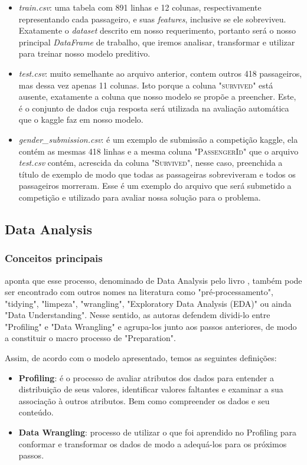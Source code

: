 \begin{itemize}
\item \emph{train.csv}:  uma tabela com 891 linhas e 12 colunas, respectivamente representando cada passageiro, e suas \emph{features}, inclusive se ele sobreviveu. Exatamente o \emph{dataset} descrito em nosso requerimento, portanto será o nosso principal \emph{DataFrame} de trabalho, que iremos analisar, transformar e utilizar para treinar nosso modelo preditivo.  
\item \emph{test.csv}: muito semelhante ao arquivo anterior, contem outros 418 passageiros, mas dessa vez apenas 11 colunas. Isto porque a coluna "\textsc{survived}" está ausente, exatamente a coluna que nosso modelo se propõe a preencher. Este, é o conjunto de dados cuja resposta será utilizada na avaliação automática que o kaggle faz em nosso modelo. 
\item \emph{gender\_submission.csv}: é um exemplo de submissão a competição kaggle, ela contém as mesmas 418 linhas e a mesma coluna "\textsc{PassengerId}" que o arquivo \emph{test.csv} contém, acrescida da coluna "\textsc{Survived}", nesse caso, preenchida a título de exemplo de modo que todas as passageiras sobreviveram e todos os passageiros morreram. Esse é um exemplo do arquivo que será submetido a competição e utilizado para avaliar nossa solução para o problema. 
\end{itemize}

\subsection{Data Analysis}
\subsubsection{Conceitos principais}
\cite{BATON} aponta que esse processo, denominado de Data Analysis pelo livro \cite{DATAPYTHON}, também pode ser encontrado com outros nomes na literatura como "pré-processamento", "tidying", "limpeza", "wrangling", "Exploratory Data Analysis (EDA)" ou ainda "Data Understanding". 
Nesse sentido, as autoras defendem dividi-lo entre "Profiling" e "Data Wrangling" e agrupa-los junto aos passos anteriores, de modo a constituir o macro processo de "Preparation". 

Assim, de acordo com o modelo apresentado, temos as seguintes definições:
\begin{itemize}
\item \textbf{Profiling}: é o processo de avaliar atributos dos dados para entender a distribuição de seus valores, identificar valores faltantes e examinar a sua associação à outros atributos. Bem como compreender os dados e seu conteúdo. 
\item \textbf{Data Wrangling}: processo de utilizar o que foi aprendido no Profiling para conformar e transformar os dados de modo a adequá-los para os próximos passos. 
\end{itemize}

